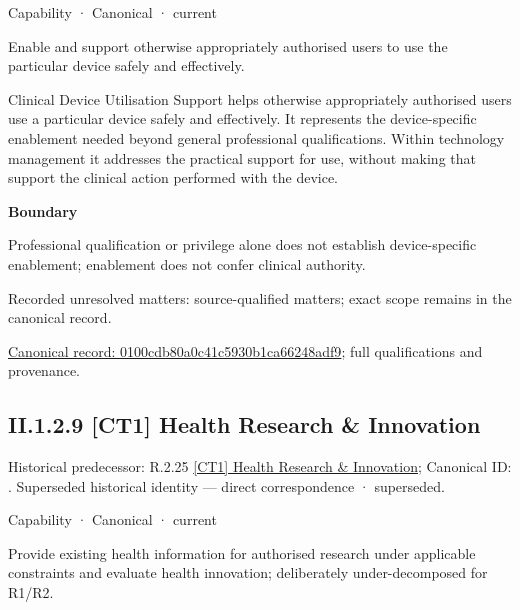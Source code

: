 \label{element:0100cdb80a0c41c5930b1ca66248adf9}
{\small Capability · Canonical · current}\par

Enable and support otherwise appropriately authorised users to use the particular device safely and effectively.



Clinical Device Utilisation Support helps otherwise appropriately authorised users use a particular device safely and effectively. It represents the device-specific enablement needed beyond general professional qualifications. Within technology management it addresses the practical support for use, without making that support the clinical action performed with the device.



\textbf{Boundary}



Professional qualification or privilege alone does not establish device-specific enablement; enablement does not confer clinical authority.


{\small Recorded unresolved matters: source-qualified matters; exact scope remains in the canonical record.}\par
{\footnotesize \href{../../../../continuum/strategy/capability/0100cdb80a0c41c5930b1ca66248adf9.md}{Canonical record: 0100cdb80a0c41c5930b1ca66248adf9}; full qualifications and provenance.}\par
\subsection*{II.1.2.9 [CT1] Health Research \& Innovation}
\label{navigation:II.1.2.9}

{\small Historical predecessor: R.2.25 \hyperref[element:2cc31384c8864c73989025cbe96dcfa7]{[CT1] Health Research \& Innovation}; Canonical ID: \texttt{}. Superseded historical identity — direct correspondence · superseded.}\par
\label{element:582bf62145fd42118e5d57bb714841e8}
{\small Capability · Canonical · current}\par

Provide existing health information for authorised research under applicable constraints and evaluate health innovation; deliberately under-decomposed for R1/R2.



